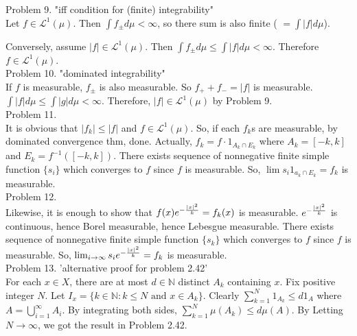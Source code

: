 \documentclass{amsart}
\begin{document}
Problem 9. "iff condition for (finite) integrability"\\

Let $f\in \mathcal{L}^1(\mu)$. Then $\int f_{\pm} d\mu < \infty$, so there sum is also finite ( $= \int \lvert f \rvert d\mu$).

Conversely, assume $\lvert f \rvert \in \mathcal{L}^1(\mu)$. Then $\int f_{\pm} d\mu \leq \int \lvert f \rvert d\mu < \infty$. Therefore $f \in \mathcal{L}^1(\mu)$.\\

Problem 10. "dominated integrability"\\

If $f$ is measurable, $f_{\pm}$ is also measurable. So $f_+ + f_- = \lvert f \rvert $ is measurable.
$\int \lvert f \rvert d\mu \leq \int \lvert g \rvert d\mu < \infty$. 
Therefore, $\lvert f \rvert \in \mathcal{L}^1(\mu)$ by Problem 9.\\

Problem 11. \\

It is obvious that $ \lvert f_k \rvert \leq \lvert f \rvert$ and $f \in \mathcal{L}^1(\mu)$.
So, if each $f_k$s are measurable, by dominated convergence thm, done.
Actually, $f_k = f \cdot 1_{A_k \cap E_k}$ where $A_k = \left [ -k, k \right ]$ and $E_k = f^{-1} (\left [ -k, k \right])$.
There exists sequence of nonnegative finite simple function $\{s_i\}$ which converges to $f$ since $f$ is measurable.
So, $\lim s_i 1_{a_k \cap E_k} = f_k$ is measurable.\\

Problem 12. \\

Likewise, it is enough to show that $f(x) e^{-{ {\lvert x \rvert}^2 \over k}} = f_k(x)$ is measurable.
$e^{-{ {\lvert x \rvert}^2 \over k}}$ is continuous, hence Borel measurable, hence Lebesgue measurable.
There exists sequence of nonnegative finite simple function $\{s_k \}$ which converges to $f$ since $f$ is measurable.
So, $\lim_{i \rightarrow \infty} s_i e^{-{ {\lvert x \rvert}^2 \over k}} = f_k$ is measurable. \\

Problem 13. 'alternative proof for problem 2.42' \\

For each $x \in X$, there are at most $d\in \mathbb{N}$ distinct $A_k$ containing $x$.
Fix positive integer $N$. Let $I_x = \{ k \in \mathbb{N} : k \leq N \text{ and } x\in A_k\}$.
Clearly $\sum_{k=1}^N 1_{A_k} \leq d 1_A$ where $A = \bigcup_{i=1}^{\infty}A_i$.
By integrating both sides, $\sum_{k=1}^N \mu(A_k) \leq d \mu(A)$.
By Letting $N \rightarrow \infty$, we got the result in Problem 2.42.
\end{document}
